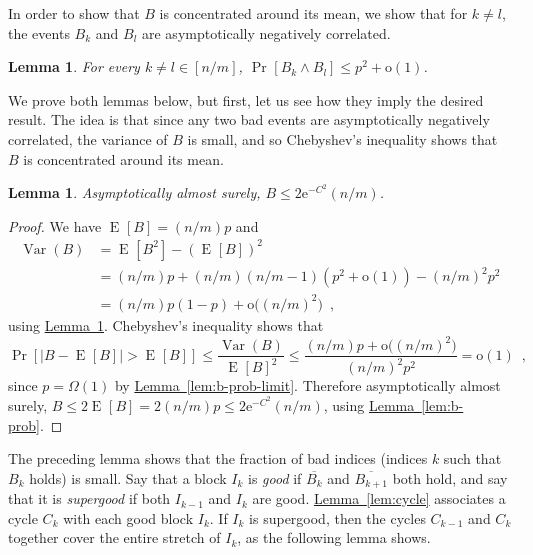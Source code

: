 \documentclass[11pt]{article}
\numberwithin{equation}{section}
\newtheorem{lemma}[theorem]{Lemma}
\theoremstyle{definition}
\theoremstyle{plain}
\newcommand{\eee}{\mathrm e}
\newcommand{\expref}[2]{\hyperref[#2]{#1~\ref{#2}}}
\theoremstyle{plain}
\theoremstyle{definition}
\newcommand{\Littleoh}[1]{\mathrm{o} \bigl( #1 \bigr)}
\newcommand{\littleoh}[1]{\mathrm{o} ( #1 )}
\newcommand{\bigomega}[1]{\Omega ( #1 )}
\DeclareMathOperator{\Expop}{E}
\DeclareMathOperator{\Varianceop}{Var}
\newcommand{\prob}[2][]{\Pr_{#1} [ #2 ]}
\newcommand{\expectation}[2][]{\Expop_{#1} [ #2 ]}
\newcommand{\variance}[1]{\Varianceop ( #1 )}
\newcommand{\eqcomma}{\enspace ,}
\begin{document}
In order to show that $B$ is concentrated around its mean, we show that for $k \neq l$, the events $B_k$ and $B_l$ are asymptotically negatively correlated.

\begin{lemma} \label{lem:correlation}
 For every $k \neq l \in [n/m]$, $\prob{B_k \land B_l} \leq p^2 + \littleoh{1}$.
\end{lemma}

We prove both lemmas below, but first, let us see how they imply the desired result. The idea is that since any two bad events are asymptotically negatively correlated, the variance of $B$ is small, and so Chebyshev's inequality shows that $B$ is concentrated around its mean.

\begin{lemma} \label{lem:concentration}
 Asymptotically almost surely, $B \leq 2\eee^{-C^2} (n/m)$.
\end{lemma}
\begin{proof}
 We have $\expectation{B} = (n/m)p$ and
\begin{align*}
 \variance{B} &= \expectation{B^2} - (\expectation{B})^2 \\ &=
 (n/m)p + (n/m)(n/m-1)(p^2 + \littleoh{1}) - (n/m)^2p^2 \\ &=
 (n/m)p(1-p) + \Littleoh{(n/m)^2} \eqcomma
\end{align*}
 using \expref{Lemma}{lem:correlation}. Chebyshev's inequality shows that
\begin{equation}
 \prob{|B-\expectation{B}|>\expectation{B}} \leq \frac{\variance{B}}{\expectation{B}^2} \leq \frac{(n/m)p + \Littleoh{(n/m)^2}}{(n/m)^2p^2} = \littleoh{1} \eqcomma
\end{equation}
 since $p = \bigomega{1}$ by \expref{Lemma}{lem:b-prob-limit}.
 Therefore asymptotically almost surely, $B \leq 2\expectation{B} = 2(n/m)p \leq 2\eee^{-C^2} (n/m)$, using \expref{Lemma}{lem:b-prob}.
\end{proof}

The preceding lemma shows that the fraction of bad indices (indices $k$ such that $B_k$ holds) is small. Say that a block $I_k$ is \emph{good} if $\overline{B_k}$ and $\overline{B_{k+1}}$ both hold, and say that it is \emph{supergood} if both $I_{k-1}$ and $I_k$ are good. \expref{Lemma}{lem:cycle} associates a cycle $C_k$ with each good block $I_k$. If $I_k$ is supergood, then the cycles $C_{k-1}$ and $C_k$ together cover the entire stretch of $I_k$, as the following lemma shows.
\end{document}
